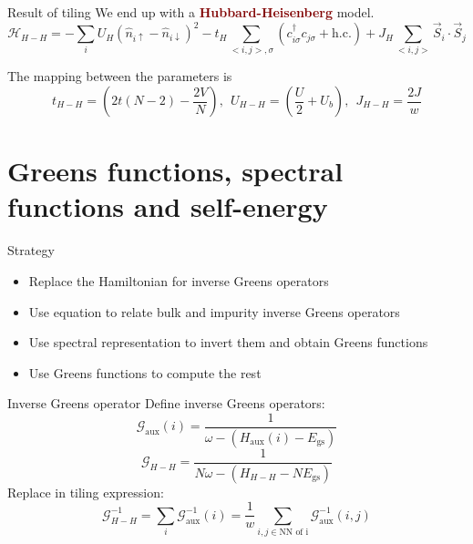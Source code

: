 \documentclass[aspectratio=169]{beamer}
\newcommand{\focus}[1]{\textcolor{maroon}{\textbf{#1}}}
\begin{document}
\begin{frame}[noframenumbering]{Result of tiling}
We end up with a \focus{Hubbard-Heisenberg} model.
\[\mathcal{H}_{H-H} = -\sum_{i} U_H \left(\hat n_{i \uparrow} - \hat n_{i \downarrow} \right)^2 - t_H\sum_{<i,j>,\sigma}\left(c^\dagger_{i\sigma}c_{j\sigma} + \text{h.c.}\right) + J_H\sum_{<i,j>} \vec{S}_i\cdot\vec{S}_j\]

The mapping between the parameters is
\[t_{H-H} = \left(2t (N-2) - \frac{2V}{N}\right),~ ~ U_{H-H} = \left(\frac{U}{2} + U_b\right), ~ ~ J_{H-H} = \frac{2J}{w}\]
\end{frame}

\section{Greens functions, spectral functions and self-energy}
\label{greens}

\begin{frame}[noframenumbering]{Strategy}
	\begin{itemize}
	\item Replace the Hamiltonian for inverse Greens operators
	\item Use equation to relate bulk and impurity inverse Greens operators
	\item Use spectral representation to invert them and obtain Greens functions
	\item Use Greens functions to compute the rest
	\end{itemize}
\end{frame}

\begin{frame}[noframenumbering]{Inverse Greens operator}
Define inverse Greens operators:
\[\mathcal{G}_\text{aux}(i) = \frac{1}{\omega - \left(H_\text{aux}(i) - E_\text{gs}\right)}\]
\[\mathcal{G}_{H-H} = \frac{1}{N \omega - \left(H_{H-H} - N E_\text{gs}\right) }\]
Replace in tiling expression:
\[\mathcal{G}^{-1}_{H-H} = \sum_i \mathcal{G}^{-1}_\text{aux}(i) = \frac{1}{w}\sum_{i, j \in \text{NN of i}}\mathcal{G}^{-1}_\text{aux}(i,j)\]
\end{frame}
\end{document}

